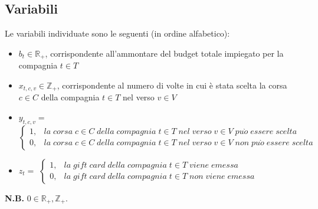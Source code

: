 \documentclass[main.tex]{subfiles}
\begin{document}
\subsection*{Variabili}
Le variabili individuate sono le seguenti (in ordine alfabetico):
\begin{itemize}
    \item $b_t \in \mathbb{R}_+$, corrispondente all'ammontare del budget totale impiegato per la compagnia $t \in T$
    \item $x_{t,c,v} \in \mathbb{Z}_+$, corrispondente al numero di volte in cui è stata scelta la corsa $c \in C$ della compagnia $t \in T$ nel verso $v \in V$
    \item $y_{t,c,v} =$
    \begin{math} { \begin{cases}
        1, & la\; corsa\; \text{$c \in C$}\; della\; compagnia\; \text{$t \in T$}\; nel\; verso\; \text{$v \in V$}\; pu\grave{o}\; essere\; scelta \\
        0, & la\; corsa\; \text{$c \in C$}\; della\; compagnia\; \text{$t \in T$}\; nel\; verso\; \text{$v \in V$}\; non\; pu\grave{o}\; essere\; scelta
    \end{cases} } \end{math}
    \item $z_t =$
    \begin{math} { \begin{cases}
        1, & la\; gift\; card\; della\; compagnia\; \text{$t \in T$}\; viene\; emessa \\
        0, & la\; gift\; card\; della\; compagnia\; \text{$t \in T$}\; non\; viene\; emessa 
    \end{cases} } \end{math}
\end{itemize}
\textbf{N.B.} $0 \in \mathbb{R}_+, \mathbb{Z}_+$.
\end{document}

